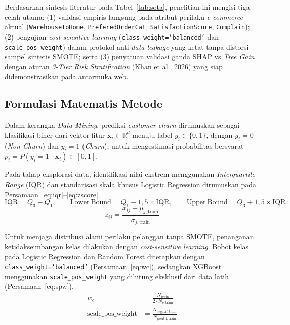 \documentclass[11pt,a4paper]{article}
\DeclareRobustCommand{\code}[1]{\texttt{\textcolor{CodeColor}{#1}}}
\begin{document}
Berdasarkan sintesis literatur pada Tabel~\ref{tab:sota}, penelitian ini mengisi tiga celah utama: (1) validasi empiris langsung pada atribut perilaku \textit{e-commerce} aktual (\code{WarehouseToHome}, \code{PreferedOrderCat}, \code{SatisfactionScore}, \code{Complain}); (2) pengujian \textit{cost-sensitive learning} (\code{class\_weight='balanced'} dan \code{scale\_pos\_weight}) dalam protokol anti-\textit{data leakage} yang ketat tanpa distorsi sampel sintetis SMOTE; serta (3) penyatuan validasi ganda SHAP vs \textit{Tree Gain} dengan aturan \textit{3-Tier Risk Stratification} (Khan et al., 2026) yang siap didemonstrasikan pada antarmuka web.

\subsection{Formulasi Matematis Metode}

Dalam kerangka \textit{Data Mining}, prediksi \textit{customer churn} dirumuskan sebagai klasifikasi biner dari vektor fitur $\mathbf{x}_i \in \mathbb{R}^d$ menuju label $y_i \in \{0, 1\}$, dengan $y_i = 0$ (\textit{Non-Churn}) dan $y_i = 1$ (\textit{Churn}), untuk mengestimasi probabilitas bersyarat $p_i = P(y_i = 1 \mid \mathbf{x}_i) \in [0, 1]$.

Pada tahap eksplorasi data, identifikasi nilai ekstrem menggunakan \textit{Interquartile Range} (IQR) dan standarisasi skala khusus Logistic Regression dirumuskan pada Persamaan~\eqref{eq:iqr}--\eqref{eq:zscore}.
\begin{equation}
  \mathrm{IQR} = Q_3 - Q_1, \qquad
  \mathrm{Lower\ Bound} = Q_1 - 1{,}5 \times \mathrm{IQR}, \qquad
  \mathrm{Upper\ Bound} = Q_3 + 1{,}5 \times \mathrm{IQR}
  \label{eq:iqr}
\end{equation}
\begin{equation}
  z_{ij} = \frac{x_{ij} - \mu_{j,\mathrm{train}}}{\sigma_{j,\mathrm{train}}}
  \label{eq:zscore}
\end{equation}

Untuk menjaga distribusi alami perilaku pelanggan tanpa SMOTE, penanganan ketidakseimbangan kelas dilakukan dengan \textit{cost-sensitive learning}. Bobot kelas pada Logistic Regression dan Random Forest ditetapkan dengan \code{class\_weight='balanced'} (Persamaan~\eqref{eq:wc}), sedangkan XGBoost menggunakan \code{scale\_pos\_weight} yang dihitung eksklusif dari data latih (Persamaan~\eqref{eq:spw}).
\begin{align}
  w_c &= \frac{N_{\mathrm{train}}}{2 \cdot N_{c,\mathrm{train}}}
  \label{eq:wc} \\
  \mathrm{scale\_pos\_weight} &= \frac{N_{\mathrm{negatif,train}}}{N_{\mathrm{positif,train}}}
  \label{eq:spw}
\end{align}
\end{document}
